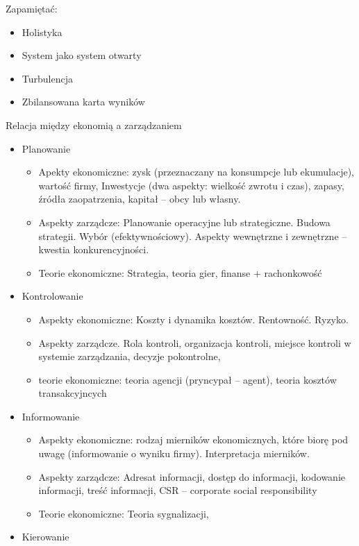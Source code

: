 \documentclass[a4paper,10pt]{report}
\begin{document}
\noindent Zapamiętać:
\begin{itemize}
	\item Holistyka
	\item System jako system otwarty
	\item Turbulencja
	\item Zbilansowana karta wyników
\end{itemize}

\noindent Relacja między ekonomią a zarządzaniem

\begin{itemize}
	\item Planowanie 
	\begin{itemize}
		\item Apekty ekonomiczne: zysk (przeznaczany na konsumpcje lub ekumulacje), wartość firmy, Inwestycje (dwa aspekty: wielkość zwrotu i czas), zapasy, źródła zaopatrzenia, kapitał -- obcy lub własny.
		\item Aspekty zarządcze: Planowanie operacyjne lub strategiczne. Budowa strategii. Wybór (efektywnościowy). Aspekty wewnętrzne i zewnętrzne -- kwestia konkurencyjności.
		\item Teorie ekonomiczne: Strategia, teoria gier, finanse + rachonkowość
	\end{itemize}
	\item Kontrolowanie
	\begin{itemize}
		\item Aspekty ekonomiczne: Koszty i dynamika kosztów. Rentowność. Ryzyko.
		\item Aspekty zarządcze. Rola kontroli, organizacja kontroli, miejsce kontroli w systemie zarządzania, decyzje pokontrolne, 
		\item teorie ekonomiczne: teoria agencji (pryncypał -- agent), teoria kosztów transakcyjncych
	\end{itemize}
	\item Informowanie
	\begin{itemize}
		\item Aspekty ekonomiczne: rodzaj mierników ekonomicznych, które biorę pod uwagę (informowanie o wyniku firmy). Interpretacja mierników. 
		\item Aspekty zarządcze: Adresat informacji, dostęp do informacji, kodowanie informacji, treść informacji, CSR -- corporate social responsibility
		\item Teorie ekonomiczne: Teoria sygnalizacji, 
	\end{itemize}
	\item Kierowanie

\end{itemize}
\end{document}
